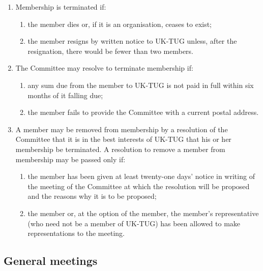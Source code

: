 \documentclass[a4paper,11pt]{article}
\begin{document}
\begin{enumerate}
\item Membership is terminated if:
  \begin{enumerate}
    \item the member dies or, if it is an organisation, ceases to exist;
    \item the member resigns by written notice to UK-TUG unless, after the
      resignation, there would be fewer than two members.
  \end{enumerate}
\item The Committee may resolve to terminate membership if:
  \begin{enumerate}
    \item any sum due from the member to UK-TUG is not paid in full within six
      months of it falling due;
    \item the member fails to provide the Committee with a current
      postal address. 
  \end{enumerate}
\item A member may be removed from membership by a resolution of the Committee
  that it is in the best interests of UK-TUG that his or her membership be
  terminated. A resolution to remove a member from membership may be passed
  only if:
  \begin{enumerate}
    \item the member has been given at least twenty-one days' notice in writing of
      the meeting of the Committee at which the resolution will be proposed and the
      reasons why it is to be proposed;
    \item the member or, at the option of the member, the member's representative
      (who need not be a member of UK-TUG) has been allowed to make representations
      to the meeting.
  \end{enumerate}
\end{enumerate}

\subsection{General meetings}
\end{document}
